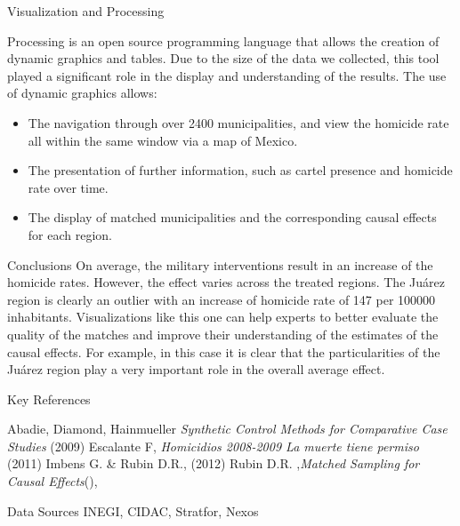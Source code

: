 \documentclass[final]{beamer}
\newlength{\sepwid}
\newlength{\onecolwid}
\begin{document}
\begin{frame}[t]
\begin{columns}[t]
\begin{column}{\onecolwid}
\begin{block}{Visualization and Processing}
\begin{figure}[htdp]
{          }
        \end{figure}
	Processing is an open source programming language that allows the creation of dynamic graphics and tables. Due to the size of the data we collected, this tool played a significant role in the display and understanding of the results. The use of dynamic graphics allows:
        \begin{itemize}
          \item The navigation through over 2400 municipalities, and view the homicide rate all within the same window via a map of Mexico.
          \item The presentation of further information, such as cartel presence and homicide rate over time.
          \item The display of matched municipalities and the corresponding causal effects for each region.
        \end{itemize}		
      \end{block}
      \begin{block}{Conclusions}
 	On average, the military interventions result in an increase of the homicide rates. However, the effect varies across the treated regions. The Ju\'{a}rez region is clearly an outlier with an increase of homicide rate of 147 per 100000 inhabitants. 
       Visualizations like this one can help experts to better evaluate the quality of the matches and improve their understanding of the estimates of the causal effects. For example, in this case it is clear that the particularities of the Juárez region play a very important role in the overall average effect. 
      \end{block}
      \begin{block}{Key References }

        
	\vspace{-0.5cm}
        \footnotesize{\begin{thebibliography}{99}
           Abadie, Diamond, Hainmueller  \emph{Synthetic Control Methods for Comparative Case Studies} (2009)
           Escalante F, \emph{Homicidios 2008-2009 La muerte tiene permiso} (2011)
           Imbens G. \& Rubin D.R., (2012)
           Rubin D.R. ,\emph{Matched Sampling for Causal Effects}(),
          \end{thebibliography}}        
      \end{block}

	      \begin{block}{Data Sources}
		\centering
	       \small{INEGI, CIDAC, Stratfor, Nexos}
	      \end{block}
    \end{column}
  \end{columns}
\end{frame}
\end{document}
